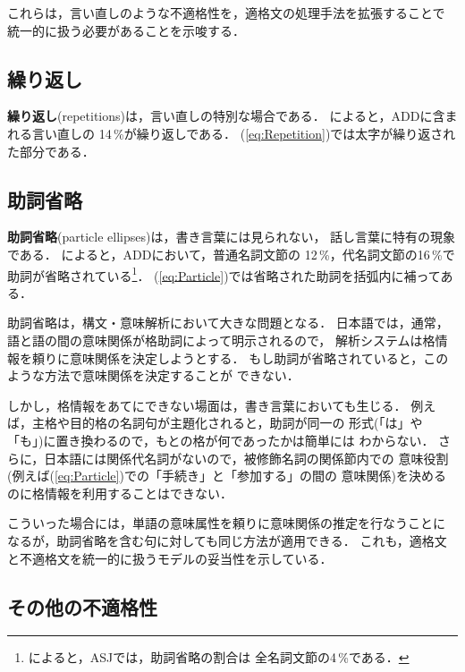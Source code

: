 これらは，言い直しのような不適格性を，適格文の処理手法を拡張することで
統一的に扱う必要があることを示唆する．

\subsection{繰り返し}\label{sec:Ill-formed:Repetition}

{\bf 繰り返し}(repetitions)は，言い直しの特別な場合である．
によると，ADDに含まれる言い直しの
14\,\%が繰り返しである．
(\ref{eq:Repetition})では太字が繰り返された部分である．

\subsection{助詞省略}\label{sec:Ill-formed:ParticleEllipsis}

{\bf 助詞省略}(particle ellipses)は，書き言葉には見られない，
話し言葉に特有の現象である．
によると，ADDにおいて，普通名詞文節の
12\,\%，代名詞文節の16\,\%で助詞が省略されている\footnote{
  によると，ASJでは，助詞省略の割合は
全名詞文節の4\,\%である．
}．
(\ref{eq:Particle})では省略された助詞を括弧内に補ってある．

助詞省略は，構文・意味解析において大きな問題となる．
日本語では，通常，語と語の間の意味関係が格助詞によって明示されるので，
解析システムは格情報を頼りに意味関係を決定しようとする．
もし助詞が省略されていると，このような方法で意味関係を決定することが
できない．

しかし，格情報をあてにできない場面は，書き言葉においても生じる．
例えば，主格や目的格の名詞句が主題化されると，助詞が同一の
形式(「は」や「も」)に置き換わるので，もとの格が何であったかは簡単には
わからない．
さらに，日本語には関係代名詞がないので，被修飾名詞の関係節内での
意味役割(例えば(\ref{eq:Particle})での「手続き」と「参加する」の間の
意味関係)を決めるのに格情報を利用することはできない．

こういった場合には，単語の意味属性を頼りに意味関係の推定を行なうことに
なるが，助詞省略を含む句に対しても同じ方法が適用できる．
これも，適格文と不適格文を統一的に扱うモデルの妥当性を示している．

\vspace*{-0.2mm}
\subsection{その他の不適格性}\label{sec:Ill-formed:Others}
\vspace*{-0.2mm}

